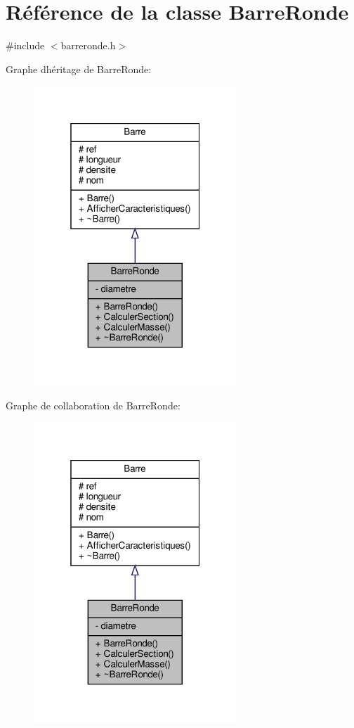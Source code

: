 \hypertarget{class_barre_ronde}{}\section{Référence de la classe Barre\+Ronde}
\label{class_barre_ronde}


{\ttfamily \#include $<$barreronde.\+h$>$}



Graphe d\textquotesingle{}héritage de Barre\+Ronde\+:
\nopagebreak
\begin{figure}[H]
\begin{center}
\leavevmode
\includegraphics[width=217pt]{class_barre_ronde__inherit__graph}
\end{center}
\end{figure}


Graphe de collaboration de Barre\+Ronde\+:
\nopagebreak
\begin{figure}[H]
\begin{center}
\leavevmode
\includegraphics[width=217pt]{class_barre_ronde__coll__graph}
\end{center}
\end{figure}
